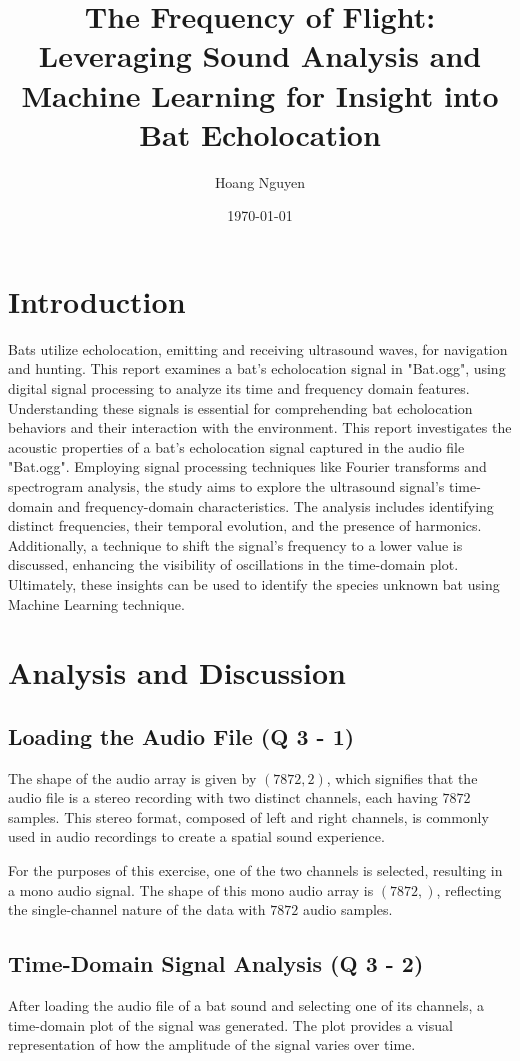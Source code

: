 \documentclass[12pt]{article}
\title{The Frequency of Flight: Leveraging Sound Analysis and Machine Learning for Insight into Bat Echolocation}
\author{Hoang Nguyen}
\date{\today}
\begin{document}
\maketitle

\section{Introduction}
    \text Bats utilize echolocation, emitting and receiving ultrasound waves, for navigation and hunting. This report examines a bat's echolocation signal in "Bat.ogg", using digital signal processing to analyze its time and frequency domain features. Understanding these signals is essential for comprehending bat echolocation behaviors and their interaction with the environment.  This report investigates the acoustic properties of a bat's echolocation signal captured in the audio file "Bat.ogg". 
    Employing signal processing techniques like Fourier transforms and spectrogram analysis, the study aims to explore the ultrasound signal's time-domain and frequency-domain characteristics. 
    The analysis includes identifying distinct frequencies, their temporal evolution, and the presence of harmonics. Additionally, a technique to shift the signal's frequency to a lower value is discussed, enhancing the visibility of oscillations in the time-domain plot. Ultimately, these insights can be used to identify the species unknown bat using Machine Learning technique.

    
\section{Analysis and Discussion}
\subsection{Loading the Audio File (Q 3 - 1)}
The shape of the audio array is given by $(7872, 2)$, which signifies that the audio file is a stereo recording with two distinct channels, each having $7872$ samples. This stereo format, composed of left and right channels, is commonly used in audio recordings to create a spatial sound experience. 

For the purposes of this exercise, one of the two channels is selected, resulting in a mono audio signal. The shape of this mono audio array is $(7872,)$, reflecting the single-channel nature of the data with $7872$ audio samples.

\subsection{Time-Domain Signal Analysis (Q 3 - 2)}
After loading the audio file of a bat sound and selecting one of its channels, a time-domain plot of the signal was generated. The plot provides a visual representation of how the amplitude of the signal varies over time.
\end{document}
